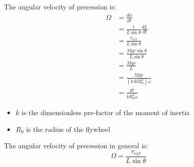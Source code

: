 \documentclass[11pt]{article}
\begin{document}
The angular velocity of precession is:
\begin{align*}
\Omega &= \frac{d \phi}{dt} \\
&= \frac{1}{L \sin \theta} \frac{dL}{dt} \\
&= \frac{\tau_{ext}}{L \sin \theta} \\
&= \frac{M gr \sin \theta}{L \sin \theta} \\
&= \frac{Mgr}{L} \\
&= \frac{Mgr}{(kMR_0^2) \omega} \\
&= \frac{gr}{kR_0^2 \omega}
\end{align*}

\begin{itemize}
\item \(k\) is the dimensionless pre-factor of the moment of inertia
\item \(R_0\) is the radius of the flywheel
\end{itemize}

The angular velocity of precession in general is:
\[\Omega = \frac{\tau_{ext}}{L \sin \theta}\]
\end{document}
